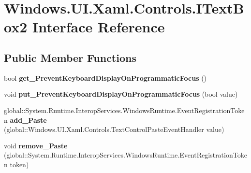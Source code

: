 \hypertarget{interface_windows_1_1_u_i_1_1_xaml_1_1_controls_1_1_i_text_box2}{}\section{Windows.\+U\+I.\+Xaml.\+Controls.\+I\+Text\+Box2 Interface Reference}
\label{interface_windows_1_1_u_i_1_1_xaml_1_1_controls_1_1_i_text_box2}
\subsection*{Public Member Functions}
\begin{DoxyCompactItemize}
\item 
\mbox{\label{interface_windows_1_1_u_i_1_1_xaml_1_1_controls_1_1_i_text_box2_a8af2302feaec834a42dc8d7416d40f7e}} 
bool {\bfseries get\+\_\+\+Prevent\+Keyboard\+Display\+On\+Programmatic\+Focus} ()
\item 
\mbox{\label{interface_windows_1_1_u_i_1_1_xaml_1_1_controls_1_1_i_text_box2_ab3b1068c9dd07e6d49f63070a27551f4}} 
void {\bfseries put\+\_\+\+Prevent\+Keyboard\+Display\+On\+Programmatic\+Focus} (bool value)
\item 
\mbox{\label{interface_windows_1_1_u_i_1_1_xaml_1_1_controls_1_1_i_text_box2_af0c1b156b0a6aa5c1695e2b35cee2f48}} 
global\+::\+System.\+Runtime.\+Interop\+Services.\+Windows\+Runtime.\+Event\+Registration\+Token {\bfseries add\+\_\+\+Paste} (global\+::\+Windows.\+U\+I.\+Xaml.\+Controls.\+Text\+Control\+Paste\+Event\+Handler value)
\item 
\mbox{\label{interface_windows_1_1_u_i_1_1_xaml_1_1_controls_1_1_i_text_box2_a269082d94ab6b91935799f8f5f0b945d}} 
void {\bfseries remove\+\_\+\+Paste} (global\+::\+System.\+Runtime.\+Interop\+Services.\+Windows\+Runtime.\+Event\+Registration\+Token token)
\item 
\mbox{\label{interface_windows_1_1_u_i_1_1_xaml_1_1_controls_1_1_i_text_box2_a8af2302feaec834a42dc8d7416d40f7e}} 

\end{DoxyCompactItemize}

